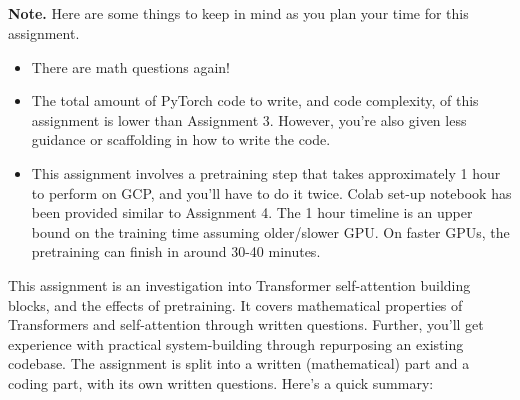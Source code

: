 \documentclass[answers]{exam}
\title{
\textmd{\textbf{\hmwkClass\ \hmwkTitle}}
}
\author{}
\date{}
\begin{document}
\vspace{-1in}

\maketitle

\vspace{-0.5in}


\begin{framed}
\noindent
 \textbf{Note.} Here are some things to keep in mind as you plan your time for this assignment.
\begin{itemize}
    \item There are math questions again!
    \item The total amount of PyTorch code to write, and code complexity, of this assignment is lower than Assignment 3. 
    However, you're also given less guidance or scaffolding in how to write the code.
    \item  This assignment involves a pretraining step that takes approximately 1 hour to perform on GCP, and you'll have to do it twice. Colab set-up notebook has been provided similar to Assignment 4. The 1 hour timeline is an upper bound on the training time assuming older/slower GPU. On faster GPUs, the pretraining can finish in around 30-40 minutes.
\end{itemize}

\end{framed}
This assignment is an investigation into Transformer self-attention building blocks, and the effects of pretraining.
It covers mathematical properties of Transformers and self-attention through written questions.
Further, you'll get experience with practical system-building through repurposing an existing codebase.
The assignment is split into a written (mathematical) part and a coding part, with its own written questions.
Here's a quick summary:
\end{document}
